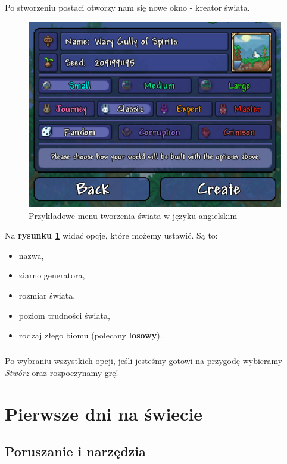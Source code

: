 \documentclass{report}
\begin{document}
\paragraph{} Po stworzeniu postaci otworzy nam się nowe okno - kreator świata. 
\begin{figure}
	\centering
	\includegraphics[scale=0.4]{createWorld}
	\caption{Przykładowe menu tworzenia świata w języku angielskim }
	\label{rys:world}
\end{figure}
Na \textbf{rysunku \ref{rys:world}} widać opcje, które możemy ustawić. Są to: 
\begin{itemize}
	\item nazwa,
	\item ziarno generatora,
	\item rozmiar świata,
	\item poziom trudności świata,
	\item rodzaj złego biomu (polecany \textbf{losowy}).
\end{itemize}
\paragraph{} Po wybraniu wszystkich opcji, jeśli jesteśmy gotowi na przygodę wybieramy \textit{Stwórz} oraz rozpoczynamy grę!
\chapter{Pierwsze dni na świecie}
\section{Poruszanie i narzędzia}
\end{document}
